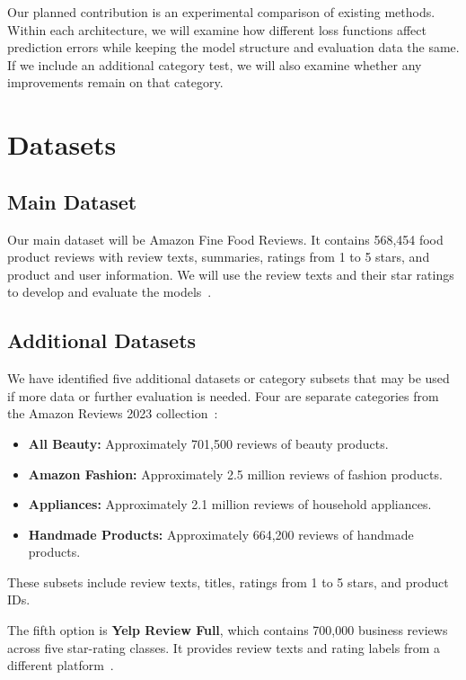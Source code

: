 \documentclass[conference,a4paper,9pt]{IEEEtran}
\begin{document}
Our planned contribution is an experimental comparison of existing methods. Within each architecture, we will examine how different loss functions affect prediction errors while keeping the model structure and evaluation data the same. If we include an additional category test, we will also examine whether any improvements remain on that category.

\section{Datasets}
\subsection{Main Dataset}

Our main dataset will be Amazon Fine Food Reviews. It contains 568,454 food product reviews with review texts, summaries, ratings from 1 to 5 stars, and product and user information. We will use the review texts and their star ratings to develop and evaluate the models~\cite{finefoods}.

\subsection{Additional Datasets}

We have identified five additional datasets or category subsets that may be used if more data or further evaluation is needed. Four are separate categories from the Amazon Reviews 2023 collection~\cite{amazon2023}:

\begin{itemize}
\item \textbf{All Beauty:} Approximately 701,500 reviews of beauty products.
\item \textbf{Amazon Fashion:} Approximately 2.5 million reviews of fashion products.
\item \textbf{Appliances:} Approximately 2.1 million reviews of household appliances.
\item \textbf{Handmade Products:} Approximately 664,200 reviews of handmade products.
\end{itemize}

These subsets include review texts, titles, ratings from 1 to 5 stars, and product IDs.

The fifth option is \textbf{Yelp Review Full}, which contains 700,000 business reviews across five star-rating classes. It provides review texts and rating labels from a different platform~\cite{yelpfull}.
\end{document}
